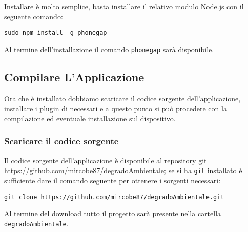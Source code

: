         Installare \pg{} è molto semplice, basta installare il relativo modulo 
        Node.js con il seguente comando:
        \begin{lstlisting}[language=plane]
 sudo npm install -g phonegap
        \end{lstlisting}
        Al termine dell'installazione il comando \texttt{phonegap} sarà 
        disponibile.
        
    \subsection{Compilare L'Applicazione}
        Ora che \pg{} è installato dobbiamo scaricare il codice sorgente 
        dell'applicazione, installare i plugin di \pg{} necessari e a questo 
        punto si può procedere con la compilazione ed eventuale installazione 
        sul dispositivo.
        
        \subsubsection{Scaricare il codice sorgente}
            Il codice sorgente dell'applicazione \pg{} è disponibile al 
            repository git 
            \url{https://github.com/mircobe87/degradoAmbientale}; se si ha 
            \texttt{git} installato è sufficiente dare il comando seguente per 
            ottenere i sorgenti necessari:
            \begin{lstlisting}[language=plane]
 git clone https://github.com/mircobe87/degradoAmbientale.git
            \end{lstlisting}
            Al termine del download tutto il progetto sarà presente nella 
            cartella \texttt{degradoAmbientale}.
            
